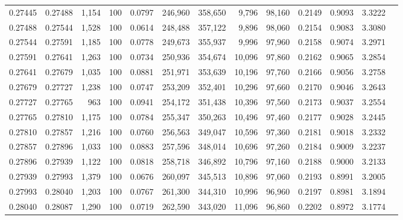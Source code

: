 \begin{tabular}{rrrrrrrrrrrrr}
0.27445 & 0.27488 &  1,154 & 100 &                                     0.0797 & 246,960 & 358,650 &   9,796 &  98,160 & 0.2149 & 0.9093 & 3.3222 \\
0.27488 & 0.27544 &  1,528 & 100 &                                     0.0614 & 248,488 & 357,122 &   9,896 &  98,060 & 0.2154 & 0.9083 & 3.3080 \\
0.27544 & 0.27591 &  1,185 & 100 &                                     0.0778 & 249,673 & 355,937 &   9,996 &  97,960 & 0.2158 & 0.9074 & 3.2971 \\
0.27591 & 0.27641 &  1,263 & 100 &                                     0.0734 & 250,936 & 354,674 &  10,096 &  97,860 & 0.2162 & 0.9065 & 3.2854 \\
0.27641 & 0.27679 &  1,035 & 100 &                                     0.0881 & 251,971 & 353,639 &  10,196 &  97,760 & 0.2166 & 0.9056 & 3.2758 \\
0.27679 & 0.27727 &  1,238 & 100 &                                     0.0747 & 253,209 & 352,401 &  10,296 &  97,660 & 0.2170 & 0.9046 & 3.2643 \\
0.27727 & 0.27765 &    963 & 100 &                                     0.0941 & 254,172 & 351,438 &  10,396 &  97,560 & 0.2173 & 0.9037 & 3.2554 \\
0.27765 & 0.27810 &  1,175 & 100 &                                     0.0784 & 255,347 & 350,263 &  10,496 &  97,460 & 0.2177 & 0.9028 & 3.2445 \\
0.27810 & 0.27857 &  1,216 & 100 &                                     0.0760 & 256,563 & 349,047 &  10,596 &  97,360 & 0.2181 & 0.9018 & 3.2332 \\
0.27857 & 0.27896 &  1,033 & 100 &                                     0.0883 & 257,596 & 348,014 &  10,696 &  97,260 & 0.2184 & 0.9009 & 3.2237 \\
0.27896 & 0.27939 &  1,122 & 100 &                                     0.0818 & 258,718 & 346,892 &  10,796 &  97,160 & 0.2188 & 0.9000 & 3.2133 \\
0.27939 & 0.27993 &  1,379 & 100 &                                     0.0676 & 260,097 & 345,513 &  10,896 &  97,060 & 0.2193 & 0.8991 & 3.2005 \\
0.27993 & 0.28040 &  1,203 & 100 &                                     0.0767 & 261,300 & 344,310 &  10,996 &  96,960 & 0.2197 & 0.8981 & 3.1894 \\
0.28040 & 0.28087 &  1,290 & 100 &                                     0.0719 & 262,590 & 343,020 &  11,096 &  96,860 & 0.2202 & 0.8972 & 3.1774 \\

\end{tabular}
